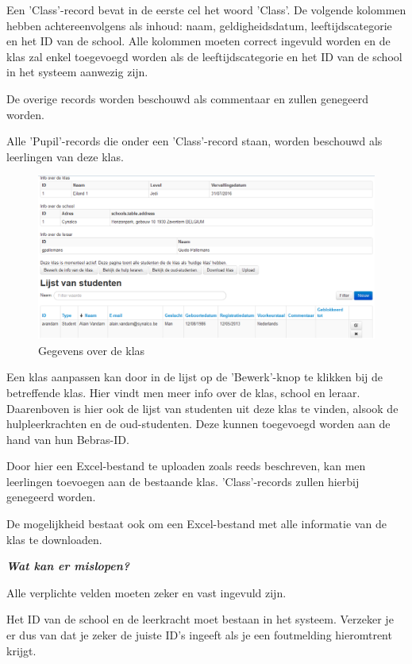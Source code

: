 \documentclass[]{article}
\begin{document}
Een 'Class'-record bevat in de eerste cel het woord 'Class'. De volgende kolommen hebben achtereenvolgens als inhoud: naam, geldigheidsdatum, leeftijdscategorie en het ID van de school. Alle kolommen moeten correct ingevuld worden en de klas zal enkel toegevoegd worden als de leeftijdscategorie en het ID van de school in het systeem aanwezig zijn. 

De overige records worden beschouwd als commentaar en zullen genegeerd worden.

Alle 'Pupil'-records die onder een 'Class'-record staan, worden beschouwd als leerlingen van deze klas. 

\begin{figure}[!ht]
	\centering
	\includegraphics[width=1\textwidth]{img/classinfo}
	\caption{Gegevens over de klas}
	\label{classinfo}
\end{figure}

Een klas aanpassen kan door in de lijst op de 'Bewerk'-knop te klikken bij de betreffende klas. Hier vindt men meer info over de klas, school en leraar. Daarenboven is hier ook de lijst van studenten uit deze klas te vinden, alsook de hulpleerkrachten en de oud-studenten. Deze kunnen toegevoegd worden aan de hand van hun Bebras-ID.

Door hier een Excel-bestand te uploaden zoals reeds beschreven, kan men leerlingen toevoegen aan de bestaande klas. 'Class'-records zullen hierbij genegeerd worden.

De mogelijkheid bestaat ook om een Excel-bestand met alle informatie van de klas te downloaden.

\textbf{\textit{Wat kan er mislopen?}}

Alle verplichte velden moeten zeker en vast ingevuld zijn.

Het ID van de school en de leerkracht moet bestaan in het systeem. Verzeker je er dus van dat je zeker de juiste ID's ingeeft als je een foutmelding hieromtrent krijgt.
\end{document}
